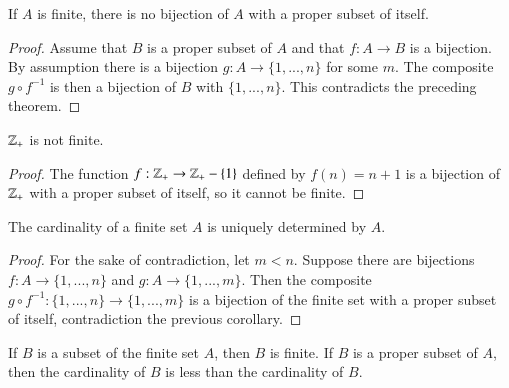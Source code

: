     \begin{corollary}
        If $A$ is finite, there is no bijection of $A$ with a proper subset of itself.
    \end{corollary}
    \begin{proof}
        Assume that $B$ is a proper subset of $A$ and that $f:A\rightarrow B$ is a bijection. By assumption there is a bijection $g:A\rightarrow \{1,...,n\}$ for some $m$. The composite $g \circ f^{-1}$ is then a bijection of $B$ with $\{1,...,n\}$. This contradicts the preceding theorem.
    \end{proof}


    \begin{corollary}
        $\mathbb Z_+$ is not finite.
    \end{corollary}
    \begin{proof}
        The function $f:\mathbb Z_+\rightarrow \mathbb Z_+ -\{1\}$ defined by $f(n) = n+1$ is a bijection of $\mathbb Z_+$ with a proper subset of itself, so it cannot be finite.
    \end{proof}


    \begin{corollary}
        The cardinality of a finite set $A$ is uniquely determined by $A$.
    \end{corollary}
    \begin{proof}
        For the sake of contradiction, let $m < n$. Suppose there are bijections $f:A\rightarrow \{1,...,n\}$ and $g:A\rightarrow \{1,...,m\}$. Then the composite $g\circ f^{-1}:\{1,...,n\}\rightarrow \{1,...,m\}$ is a bijection of the finite set with a proper subset of itself, contradiction the previous corollary.
    \end{proof}


    \begin{corollary}
        If $B$ is a subset of the finite set $A$, then $B$ is finite. If $B$ is a proper subset of $A$, then the cardinality of $B$ is less than the cardinality of $B$.
    \end{corollary}
    

